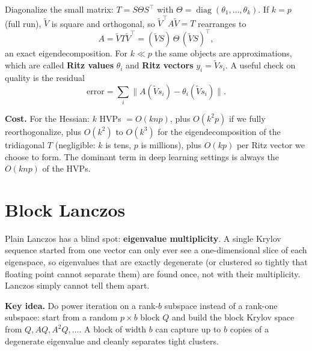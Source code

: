 \documentclass[11pt]{article}
\begin{document}
Diagonalize the small matrix: $T = S \Theta S^\top$ with $\Theta = \operatorname{diag}(\theta_1, \dots, \theta_k)$. If $k = p$ (full run), $\tilde V$ is square and orthogonal, so $\tilde V^\top A \tilde V = T$ rearranges to
\[
A = \tilde V T \tilde V^\top = (\tilde V S)\, \Theta\, (\tilde V S)^\top ,
\]
an exact eigendecomposition. For $k \ll p$ the same objects are approximations, which are called \textbf{Ritz values} $\theta_i$ and \textbf{Ritz vectors} $y_i = \tilde V s_i$. A useful check on quality is the residual
\[
\text{error} = \sum_i \big\| A (\tilde V s_i) - \theta_i (\tilde V s_i) \big\| .
\]

\textbf{Cost.} For the Hessian: $k$ HVPs $= O(knp)$, plus $O(k^2 p)$ if we fully reorthogonalize, plus $O(k^2)$ to $O(k^3)$ for the eigendecomposition of the tridiagonal $T$ (negligible: $k$ is tens, $p$ is millions), plus $O(kp)$ per Ritz vector we choose to form. The dominant term in deep learning settings is always the $O(knp)$ of the HVPs.

\section{Block Lanczos}

Plain Lanczos has a blind spot: \textbf{eigenvalue multiplicity}. A single Krylov sequence started from one vector can only ever see a one-dimensional slice of each eigenspace, so eigenvalues that are exactly degenerate (or clustered so tightly that floating point cannot separate them) are found once, not with their multiplicity. Lanczos simply cannot tell them apart.

\textbf{Key idea.} Do power iteration on a rank-$b$ subspace instead of a rank-one subspace: start from a random $p \times b$ block $Q$ and build the block Krylov space from $Q, AQ, A^2Q, \dots$. A block of width $b$ can capture up to $b$ copies of a degenerate eigenvalue and cleanly separates tight clusters.
\end{document}
